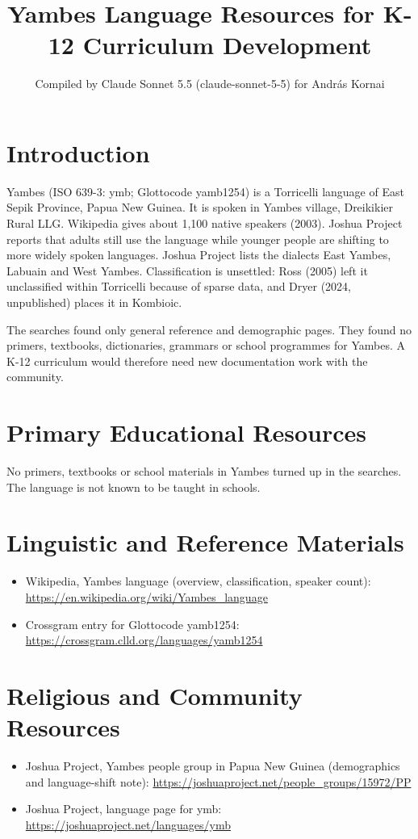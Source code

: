 \documentclass[12pt]{article}
\title{Yambes Language Resources for K-12 Curriculum Development}
\author{Compiled by Claude Sonnet 5.5 (claude-sonnet-5-5) for Andr\'as Kornai}
\date{}
\begin{document}
\maketitle

\section{Introduction}
Yambes (ISO 639-3: ymb; Glottocode yamb1254) is a Torricelli language of East Sepik Province, Papua New Guinea. It is spoken in Yambes village, Dreikikier Rural LLG. Wikipedia gives about 1,100 native speakers (2003). Joshua Project reports that adults still use the language while younger people are shifting to more widely spoken languages. Joshua Project lists the dialects East Yambes, Labuain and West Yambes. Classification is unsettled: Ross (2005) left it unclassified within Torricelli because of sparse data, and Dryer (2024, unpublished) places it in Kombioic.

The searches found only general reference and demographic pages. They found no primers, textbooks, dictionaries, grammars or school programmes for Yambes. A K-12 curriculum would therefore need new documentation work with the community.

\section{Primary Educational Resources}
No primers, textbooks or school materials in Yambes turned up in the searches. The language is not known to be taught in schools.

\section{Linguistic and Reference Materials}
\begin{itemize}
\item Wikipedia, Yambes language (overview, classification, speaker count): \url{https://en.wikipedia.org/wiki/Yambes_language}
\item Crossgram entry for Glottocode yamb1254: \url{https://crossgram.clld.org/languages/yamb1254}
\end{itemize}

\section{Religious and Community Resources}
\begin{itemize}
\item Joshua Project, Yambes people group in Papua New Guinea (demographics and language-shift note): \url{https://joshuaproject.net/people_groups/15972/PP}
\item Joshua Project, language page for ymb: \url{https://joshuaproject.net/languages/ymb}
\end{itemize}
\end{document}
